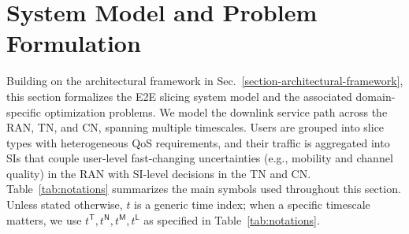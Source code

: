 \documentclass[12pt,lettersize,journal,onecolumn]{IEEEtran}
\begin{document}

\section{System Model and Problem Formulation} \label{system-model-section}
Building on the architectural framework in Sec.~\ref{section-architectural-framework}, this section formalizes the E2E slicing system model and the associated domain-specific optimization problems. We model the downlink service path across the RAN, TN, and CN, spanning multiple timescales. Users are grouped into slice types with heterogeneous QoS requirements, and their traffic is aggregated into SIs that couple user-level fast-changing uncertainties (e.g., mobility and channel quality) in the RAN with SI-level decisions in the TN and CN. Table~\ref{tab:notations} summarizes the main symbols used throughout this section. Unless stated otherwise, $t$ is a generic time index; when a specific timescale matters, we use $t^{\mathsf{T}},t^{\mathsf{N}},t^{\mathsf{M}},t^{\mathsf{L}}$ as specified in Table~\ref{tab:notations}. %
\end{document}
